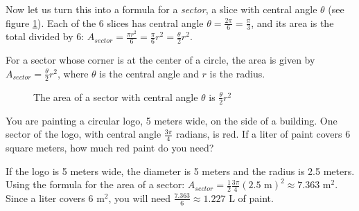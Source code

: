 Now let us turn this into a formula for a \emph{sector}, a slice with
central angle $\theta$ (see figure \ref{fig:sector}). Each of the 6 slices
has central angle $\theta = \frac{2\pi}{6} = \frac{\pi}{3}$, and its area is
the total divided by 6: $A_{sector} = \frac{\pi r^2}{6} = 
\frac{\pi}{6} r^2 = \frac{\theta}{2} r^2$. 

\begin{mdframed}[style=important, frametitle={Area of a sector}]
For a sector whose corner is at the center of a circle, the area is given by 
$A_{sector} = \frac{\theta}{2} r^2$, where $\theta$ is the central angle and $r$ is the radius. 

\end{mdframed}

\begin{figure}[H]
\centering
{}
    \caption{The area of a sector with central angle $\theta$ is $\frac{\theta}{2}r^2$}
    \label{fig:sector}
\end{figure}

\begin{Exercise}[title = {Area of a sector}, label = sector]
You are painting a circular logo, 5 meters wide, on the side of a building.
One sector of the logo, with central angle $\frac{3\pi}{4}$ radians, is red.
If a liter of paint covers 6 square meters, how much red paint do you need?
\end{Exercise}

\begin{Answer}[ref = sector]
If the logo is 5 meters wide, the diameter is 5 meters and the radius is 2.5 
meters. Using the formula for the area of a sector: $A_{sector} = \frac{1}{2}
\frac{3\pi}{4}(2.5\text{ m})^2 \approx 7.363\text{ m}^2$. Since a liter covers 
$6\text{ m}^2$, you will need $\frac{7.363}{6} \approx 1.227\text{ L}$ of paint. 
\end{Answer}

